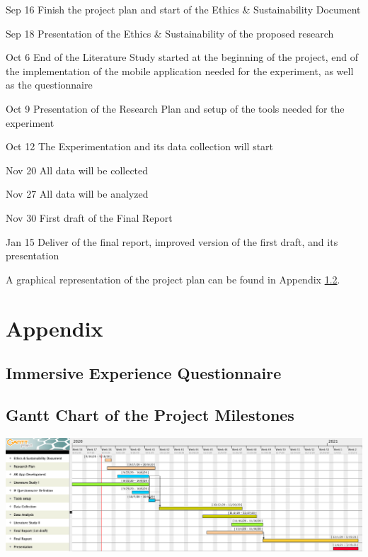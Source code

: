\documentclass[12pt,twoside,english]{article}
\begin{document}
\begin{description}
\item{Sep 16} Finish the project plan and start of the Ethics \& Sustainability Document

\item {Sep 18} Presentation of the Ethics \& Sustainability of the proposed research

\item {Oct 6} End of the Literature Study started at the beginning of the project, end of the implementation of the mobile application needed for the experiment, as well as the questionnaire

\item {Oct 9} Presentation of the Research Plan and setup of the tools needed for the experiment

\item {Oct 12} The Experimentation and its data collection will start

\item {Nov 20} All data will be collected

\item {Nov 27} All data will be analyzed

\item {Nov 30} First draft of the Final Report

\item {Jan 15} Deliver of the final report, improved version of the first draft, and its presentation

\end{description}

A graphical representation of the project plan can be found in Appendix \ref{sect:gantt_chart}.


% 


\appendix
\section{Appendix}
\label{sect:appendix}

\subsection{Immersive Experience Questionnaire}
\label{sect:ieq}


\subsection{Gantt Chart of the Project Milestones}
\label{sect:gantt_chart}

\includegraphics[width=\textwidth]{imgs/project_milestones}

\printglossary[type=\acronymtype, nonumberlist]
\clearpage
\end{document}
